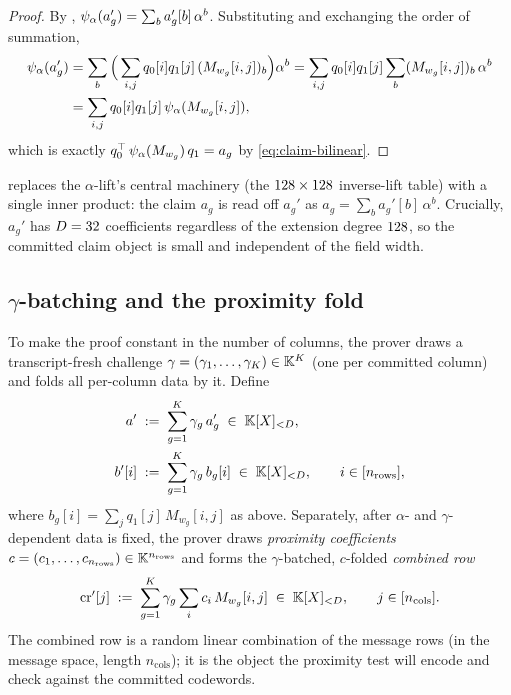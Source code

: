 \begin{proof}
By , $\psi_{\alpha}(a_g') = \sum_b a_g'[b]\,\alpha^b$.
Substituting  and exchanging the order of summation,
\[
\begin{aligned}
  \psi_{\alpha}(a_g')
  &= \sum_b \Big(\sum_{i,j} q_0[i]q_1[j]\,(M_{w_g}[i,j])_b\Big)\alpha^b
   = \sum_{i,j} q_0[i]q_1[j]\sum_b (M_{w_g}[i,j])_b\,\alpha^b \\
  &= \sum_{i,j} q_0[i]q_1[j]\,\psi_{\alpha}(M_{w_g}[i,j]),
\end{aligned}
\]
which is exactly $q_0^\top\,\psi_{\alpha}(M_{w_g})\,q_1 = a_g$ by
\eqref{eq:claim-bilinear}.
\end{proof}

 replaces the $\alpha$-lift's central machinery (the
$128\times128$ inverse-lift table) with a single inner product:
the claim $a_g$ is read off $a_g'$ as
$a_g = \sum_b a_g'[b]\,\alpha^b$. Crucially, $a_g'$ has $D = 32$
coefficients regardless of the extension degree $128$, so the
committed claim object is small and independent of the field width.

\subsection{$\gamma$-batching and the proximity fold}

To make the proof constant in the number of columns, the prover draws a
transcript-fresh challenge $\gamma = (\gamma_1,\dots,\gamma_K) \in \mathbb{K}^K$
(one per committed column) and folds all per-column data by it. Define
\begin{align}
  a' &\;:=\; \sum_{g=1}^{K} \gamma_g\,a_g' \;\in\; \mathbb{K}[X]_{<D},
  \label{eq:a-batch}\\
  b'[i] &\;:=\; \sum_{g=1}^{K} \gamma_g\,b_g[i] \;\in\; \mathbb{K}[X]_{<D},
    \qquad i \in [n_{\mathrm{rows}}],
  \label{eq:b-batch}
\end{align}
where $b_g[i] = \sum_j q_1[j]\,M_{w_g}[i,j]$ as above. Separately, after
$\alpha$- and $\gamma$-dependent data is fixed, the prover draws
\emph{proximity coefficients} $c = (c_1,\dots,c_{n_{\mathrm{rows}}}) \in
\mathbb{K}^{n_{\mathrm{rows}}}$ and forms the $\gamma$-batched, $c$-folded
\emph{combined row}
\begin{equation}
  \label{eq:combined-row}
  \mathrm{cr}'[j] \;:=\; \sum_{g=1}^{K} \gamma_g \sum_{i} c_i\,M_{w_g}[i,j]
  \;\in\; \mathbb{K}[X]_{<D},
  \qquad j \in [n_{\mathrm{cols}}].
\end{equation}
The combined row is a random linear combination of the message rows (in
the message space, length $n_{\mathrm{cols}}$); it is the object the
proximity test will encode and check against the committed codewords.

